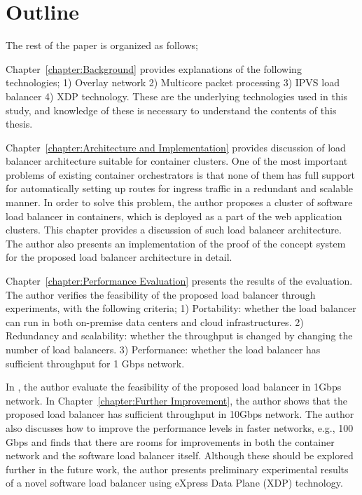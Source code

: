 \section{Outline}


The rest of the paper is organized as follows;

Chapter~\ref{chapter:Background} provides explanations of the following technologies;
  1) Overlay network
  2) Multicore packet processing
  3) IPVS load balancer
  4) XDP technology.
  These are the underlying technologies used in this study, and knowledge of these is necessary to understand the contents of this thesis.

Chapter~\ref{chapter:Architecture and Implementation} provides discussion of load balancer architecture suitable for container clusters.
One of the most important problems of existing container orchestrators is that none of them has full support for automatically setting up routes for ingress traffic in a redundant and scalable manner.
In order to solve this problem, the author proposes a cluster of software load balancer in containers, which is deployed as a part of the web application clusters.
This chapter provides a discussion of such load balancer architecture.
The author also presents an implementation of the proof of the concept system for the proposed load balancer architecture in detail.

Chapter~\ref{chapter:Performance Evaluation} presents the results of the evaluation.
The author verifies the feasibility of the proposed load balancer through experiments, with the following criteria;
1) Portability: whether the load balancer can run in both on-premise data centers and cloud infrastructures.
2) Redundancy and scalability: whether the throughput is changed by changing the number of load balancers.
3) Performance: whether the load balancer has sufficient throughput for 1 Gbps network.

In , the author evaluate the feasibility of the proposed load balancer in  1Gbps network.
In Chapter~\ref{chapter:Further Improvement}, the author shows that the proposed load balancer has sufficient throughput in 10Gbps network.
The author also discusses how to improve the performance levels in faster networks, e.g., 100 Gbps and finds that there are rooms for improvements in both the container network and the software load balancer itself.
Although these should be explored further in the future work, the author presents preliminary experimental results of a novel software load balancer using eXpress Data Plane (XDP) technology.

